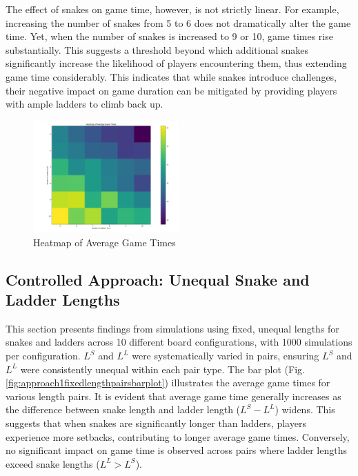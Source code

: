 \documentclass[12pt]{report}
\begin{document}
	The effect of snakes on game time, however, is not strictly linear. For example, increasing the number of snakes from 5 to 6 does not dramatically alter the game time. Yet, when the number of snakes is increased to 9 or 10, game times rise substantially. This suggests a threshold beyond which additional snakes significantly increase the likelihood of players encountering them, thus extending game time considerably. This indicates that while snakes introduce challenges, their negative impact on game duration can be mitigated by providing players with ample ladders to climb back up.
	
	\begin{figure}[th]
		\centering
		\includegraphics[width=0.5\textwidth]{"../Chapter 1/Heatmap"}
		\caption{Heatmap of Average Game Times}
		\label{fig:heatmap}
	\end{figure}
	
	
	\subsection{Controlled Approach: Unequal Snake and Ladder Lengths}
	
	This section presents findings from simulations using fixed, unequal lengths for snakes and ladders across 10 different board configurations, with 1000 simulations per configuration. $L^S$ and $L^L$ were  systematically varied in pairs, ensuring $L^S$ and $L^L$ were consistently unequal within each pair type. The bar plot (Fig. \ref{fig:approach1fixedlengthpairsbarplot}) illustrates the average game times for various length pairs. It is evident that average game time generally increases as the difference between snake length and ladder length ($L^S - L^L$) widens. This suggests that when snakes are significantly longer than ladders, players experience more setbacks, contributing to longer average game times. Conversely, no significant impact on game time is observed across pairs where ladder lengths exceed snake lengths ($L^L > L^S$).
	
\end{document}
